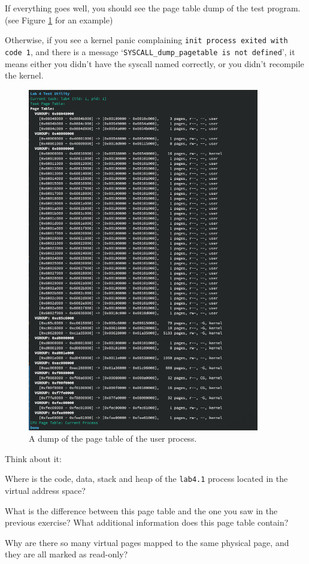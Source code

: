If everything goes well, you should see the page table dump of the test program.
(see Figure \ref{fig:user_mm_dump_pagetable} for an example)

Otherwise, if you see a kernel panic complaining \texttt{init process exited with code 1},
and there is a message `\texttt{SYSCALL\_dump\_pagetable is not defined}', it means
either you didn't have the syscall named correctly, or you didn't recompile the kernel.

\begin{figure}[htbp]
    \centering
    \includegraphics[width=0.9\textwidth]{assets/c4.user-page-table-dump.png}
    \caption{A dump of the page table of the user process.}
    \label{fig:user_mm_dump_pagetable}
\end{figure}

\begin{exercise*}{Think about it:}
    \item Where is the code, data, stack and heap of the \texttt{lab4.1} process
    located in the virtual address space?
    \item What is the difference between this page table and the one you saw
    in the previous exercise? What additional information does this page table
    contain?
    \item Why are there so many virtual pages mapped to the same physical page, and
    they are all marked as read-only?
\end{exercise*}

